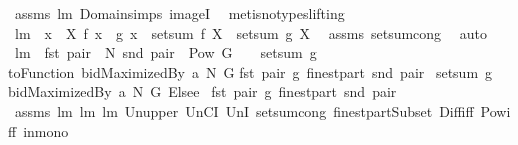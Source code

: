 \begin{isabellebody}
\isamarkupfalse%
\ assms\ lm{}{}\ Domain{\isachardot}simps\ imageI\ \isamarkupfalse%
\ {\isacharparenleft}metis{\isacharparenleft}no{\isacharunderscore}types{\isacharcomma}lifting{\isacharparenright}{\isacharparenright}%
\endisatagproof
{\isafoldproof}%
%
\isadelimproof
%
\endisadelimproof
\isanewline
\isanewline
\isanewline
\isanewline
\isanewline
{}\isamarkupfalse%
\ lm{}{}{\isacharcolon}\ \ {\isachardoublequoteopen}{\isasymforall}x\ {\isasymin}\ X{\isachardot}\ f\ x\ {\isacharequal}\ g\ x{\isachardoublequoteclose}\ \ {\isachardoublequoteopen}setsum\ f\ X\ {\isacharequal}\ setsum\ g\ X{\isachardoublequoteclose}\ \isanewline
%
\isadelimproof
%
\endisadelimproof
%
\isatagproof
{}\isamarkupfalse%
\ assms\ setsum{\isachardot}cong\ \isamarkupfalse%
\ auto%
\endisatagproof
{\isafoldproof}%
%
\isadelimproof
\isanewline
%
\endisadelimproof
\isanewline
{}\isamarkupfalse%
\ lm{}{}{\isacharcolon}\ \ {\isachardoublequoteopen}fst\ pair\ {\isasymin}\ N{\isachardoublequoteclose}\ {\isachardoublequoteopen}snd\ pair\ {\isasymin}\ Pow\ G\ {\isacharminus}\ {\isacharbraceleft}{\isacharbraceleft}{\isacharbraceright}{\isacharbraceright}{\isachardoublequoteclose}\ \ {\isachardoublequoteopen}setsum\ {\isacharparenleft}{\isacharpercent}g{\isachardot}\isanewline
{\isacharparenleft}toFunction\ {\isacharparenleft}bidMaximizedBy\ a\ N\ G{\isacharparenright}{\isacharparenright}\isanewline
{\isacharparenleft}fst\ pair{\isacharcomma}\ g{\isacharparenright}{\isacharparenright}\ {\isacharparenleft}finestpart\ {\isacharparenleft}snd\ pair{\isacharparenright}{\isacharparenright}\ {\isacharequal}\isanewline
setsum\ {\isacharparenleft}{\isacharpercent}g{\isachardot}\ \isanewline
{\isacharparenleft}{\isacharparenleft}bidMaximizedBy\ a\ N\ G{\isacharparenright}\ Elsee\ {}{\isacharparenright}\isanewline
{\isacharparenleft}fst\ pair{\isacharcomma}\ g{\isacharparenright}{\isacharparenright}\ {\isacharparenleft}finestpart\ {\isacharparenleft}snd\ pair{\isacharparenright}{\isacharparenright}{\isachardoublequoteclose}\isanewline
%
\isadelimproof
%
\endisadelimproof
%
\isatagproof
{}\isamarkupfalse%
\ assms\ lm{}{}\ lm{}{}\ lm{}{}\ Un{\isacharunderscore}upper{}\ UnCI\ UnI{}\ setsum{\isachardot}cong\ finestpartSubset\ Diff{\isacharunderscore}iff\ Pow{\isacharunderscore}iff\ in{\isacharunderscore}mono\isanewline

\end{isabellebody}
